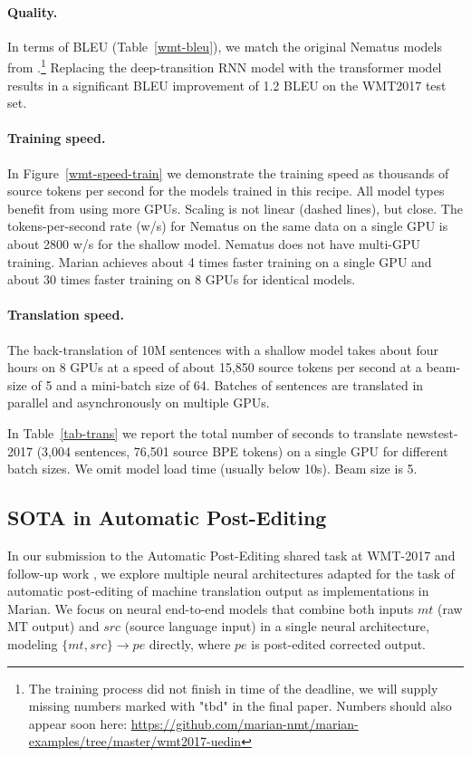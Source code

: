 \documentclass[11pt,a4paper]{article}
\begin{document}
\paragraph{Quality.} In terms of BLEU (Table~\ref{wmt-bleu}), we match  the original Nematus models from .\footnote{The training process did not finish in time of the deadline, we will supply missing numbers marked with "tbd" in the final paper. Numbers should also appear soon here: \url{https://github.com/marian-nmt/marian-examples/tree/master/wmt2017-uedin}}
Replacing the deep-transition RNN model with the transformer model results in a significant BLEU improvement of 1.2 BLEU on the WMT2017 test set. 

\paragraph{Training speed.}

In Figure~\ref{wmt-speed-train} we demonstrate the training speed as thousands of source tokens per second for the models trained in this recipe. All model types benefit from using more GPUs. Scaling is not linear (dashed lines), but close. The tokens-per-second rate (w/s) for Nematus on the same data on a single GPU is about 2800 w/s for the shallow model. Nematus does not have multi-GPU training. Marian achieves about 4 times faster training on a single GPU and about 30 times faster training on 8 GPUs for identical models.

\paragraph{Translation speed.}

The back-translation of 10M sentences with a shallow model takes about four hours on 8 GPUs at a speed of about 15,850 source tokens per second at a beam-size of 5 and a mini-batch size of 64. Batches of sentences are translated in parallel and asynchronously on multiple GPUs. 

In Table~\ref{tab-trans} we report the total number of seconds to translate newstest-2017 (3,004 sentences, 76,501 source BPE tokens) on a single GPU for different batch sizes. We omit model load time (usually below 10s). Beam size is 5.


\subsection{SOTA in Automatic Post-Editing}
In our submission to the Automatic Post-Editing shared task at WMT-2017 \cite{bojar-EtAl:2017:WMT1} and follow-up work \cite{junczysdowmunt-grundkiewicz:2017:WMT, I17-1013}, 
we explore multiple neural architectures adapted for the task of automatic post-editing of machine translation output as implementations in Marian. We focus on neural end-to-end models that combine both inputs $mt$ (raw MT output) and $src$ (source language input) in a single neural architecture, modeling $\{mt,src\}\rightarrow pe$ directly, where $pe$ is post-edited corrected output.
\end{document}
